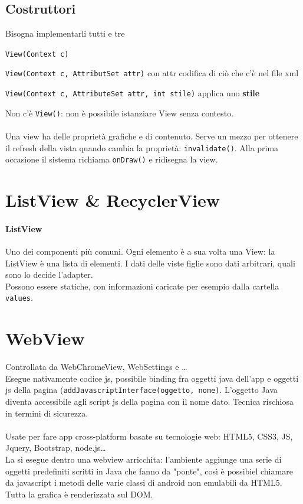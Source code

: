 \documentclass[10pt]{book}
\begin{document}
\subsection{Costruttori}
Bisogna implementarli tutti e tre
\begin{list}{}{}
	\item \texttt{View(Context c)}
	\item \texttt{View(Context c, AttributSet attr)} con attr codifica di ciò che c'è nel file xml
	\item \texttt{View(Context c, AttributeSet attr, int stile)} applica uno \textbf{stile}
\end{list}
Non c'è \texttt{View()}: non è possibile istanziare View senza contesto.\\\\
Una view ha delle proprietà grafiche e di contenuto. Serve un mezzo per ottenere il refresh della vista quando cambia la proprietà: \texttt{invalidate()}. Alla prima occasione il sistema richiama \texttt{onDraw()} e ridisegna la view.

\section{ListView \& RecyclerView}
\paragraph{ListView} Uno dei componenti più comuni. Ogni elemento è a sua volta una View: la ListView è una lista di elementi. I dati delle viste figlie sono dati arbitrari, quali sono lo decide l'adapter.\\
Possono essere statiche, con informazioni caricate per esempio dalla cartella \texttt{values}.
\section{WebView}
Controllata da WebChromeView, WebSettings e \ldots\\
Esegue nativamente codice js, possibile binding fra oggetti java dell'app e oggetti js della pagina (\texttt{addJavascriptInterface(oggetto, nome)}. L'oggetto Java diventa accessibile agli script js della pagina con il nome dato. Tecnica rischiosa in termini di sicurezza.\\\\
Usate per fare app cross-platform basate su tecnologie web: HTML5, CSS3, JS, Jquery, Bootstrap, node.js\ldots\\
La si esegue dentro una webview arricchita: l'ambiente aggiunge una serie di oggetti predefiniti scritti in Java che fanno da "ponte", così è possibiel chiamare da javascript i metodi delle varie classi di android non emulabili da HTML5.\\
Tutta la grafica è renderizzata sul DOM.
\end{document}
